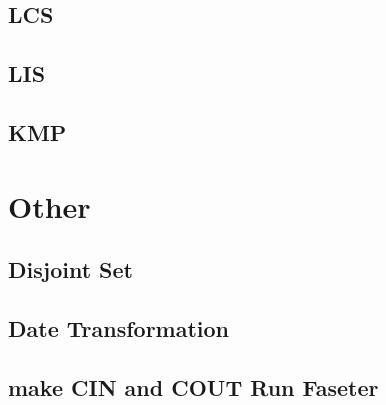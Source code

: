 \documentclass[8pt,twocolumn, landscape, a4paper]{report}
\begin{document}
\subsection{LCS}


\subsection{LIS}


\subsection{KMP}


\section{Other}

\subsection{Disjoint Set}


\subsection{Date Transformation}

\subsection{make CIN and COUT Run Faseter}

\end{document}
